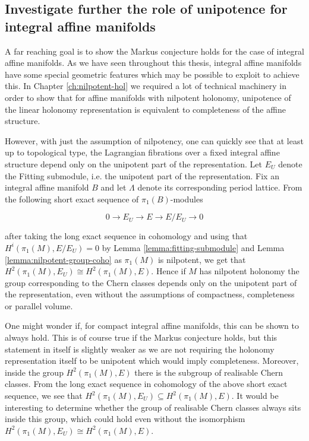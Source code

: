 \subsection*{Investigate further the role of unipotence for integral affine manifolds}
A far reaching goal is to show the Markus conjecture holds for the case of
integral affine manifolds. As we have seen throughout this thesis, integral
affine manifolds have some special geometric features which may be possible to
exploit to achieve this. In Chapter \ref{ch:nilpotent-hol} we required a lot of
technical machinery in order to show that for affine manifolds with nilpotent
holonomy, unipotence of the linear holonomy representation is equivalent to
completeness of the affine structure.

However, with just the assumption of nilpotency, one can quickly see that at
least up to topological type, the Lagrangian fibrations over a fixed integral
affine structure depend only on the unipotent part of the representation. Let
$E_U$ denote the Fitting submodule, i.e. the unipotent part of the
representation. Fix an integral affine manifold $B$ and let $\Lambda$ denote
its corresponding period lattice. From the following short exact sequence of
$\pi_1(B)$-modules

$$
    0 \to E_U \to E \to E/E_U \to 0
$$

after taking the long exact sequence in cohomology and using that
$H^i(\pi_1(M), E/E_U) = 0$ by Lemma \ref{lemma:fitting-submodule} and Lemma
\ref{lemma:nilpotent-group-coho} as $\pi_1(M)$ is nilpotent, we get that
$H^2(\pi_1(M), E_U) \cong H^2(\pi_1(M), E)$. Hence if $M$ has nilpotent
holonomy the group corresponding to the Chern classes depends only on the
unipotent part of the representation, even without the assumptions of
compactness, completeness or parallel volume.

One might wonder if, for compact integral affine manifolds, this can be shown
to always hold. This is of course true if the Markus conjecture holds, but this
statement in itself is slightly weaker as we are not requiring the holonomy
representation itself to be unipotent which would imply completeness. Moreover,
inside the group $H^2(\pi_1(M), E)$ there is the subgroup of realisable Chern
classes. From the long exact sequence in cohomology of the above short exact
sequence, we see that $H^2(\pi_1(M), E_U) \subseteq H^2(\pi_1(M), E)$. It would
be interesting to determine whether the group of realisable Chern classes
always sits inside this group, which could hold even without the isomorphism
$H^2(\pi_1(M), E_U) \cong H^2(\pi_1(M), E)$.
